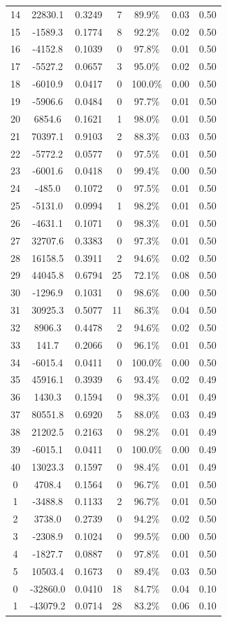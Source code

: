 \documentclass{article}
\begin{document}
\begin{longtable}{@{}cccrccc@{}}
14 & 22830.1 & 0.3249 & 7 & 89.9\% & 0.03 & 0.50 \\
15 & -1589.3 & 0.1774 & 8 & 92.2\% & 0.02 & 0.50 \\
16 & -4152.8 & 0.1039 & 0 & 97.8\% & 0.01 & 0.50 \\
17 & -5527.2 & 0.0657 & 3 & 95.0\% & 0.02 & 0.50 \\
18 & -6010.9 & 0.0417 & 0 & 100.0\% & 0.00 & 0.50 \\
19 & -5906.6 & 0.0484 & 0 & 97.7\% & 0.01 & 0.50 \\
20 & 6854.6 & 0.1621 & 1 & 98.0\% & 0.01 & 0.50 \\
21 & 70397.1 & 0.9103 & 2 & 88.3\% & 0.03 & 0.50 \\
22 & -5772.2 & 0.0577 & 0 & 97.5\% & 0.01 & 0.50 \\
23 & -6001.6 & 0.0418 & 0 & 99.4\% & 0.00 & 0.50 \\
24 & -485.0 & 0.1072 & 0 & 97.5\% & 0.01 & 0.50 \\
25 & -5131.0 & 0.0994 & 1 & 98.2\% & 0.01 & 0.50 \\
26 & -4631.1 & 0.1071 & 0 & 98.3\% & 0.01 & 0.50 \\
27 & 32707.6 & 0.3383 & 0 & 97.3\% & 0.01 & 0.50 \\
28 & 16158.5 & 0.3911 & 2 & 94.6\% & 0.02 & 0.50 \\
29 & 44045.8 & 0.6794 & 25 & 72.1\% & 0.08 & 0.50 \\
30 & -1296.9 & 0.1031 & 0 & 98.6\% & 0.00 & 0.50 \\
31 & 30925.3 & 0.5077 & 11 & 86.3\% & 0.04 & 0.50 \\
32 & 8906.3 & 0.4478 & 2 & 94.6\% & 0.02 & 0.50 \\
33 & 141.7 & 0.2066 & 0 & 96.1\% & 0.01 & 0.50 \\
34 & -6015.4 & 0.0411 & 0 & 100.0\% & 0.00 & 0.50 \\
35 & 45916.1 & 0.3939 & 6 & 93.4\% & 0.02 & 0.49 \\
36 & 1430.3 & 0.1594 & 0 & 98.3\% & 0.01 & 0.49 \\
37 & 80551.8 & 0.6920 & 5 & 88.0\% & 0.03 & 0.49 \\
38 & 21202.5 & 0.2163 & 0 & 98.2\% & 0.01 & 0.49 \\
39 & -6015.1 & 0.0411 & 0 & 100.0\% & 0.00 & 0.49 \\
40 & 13023.3 & 0.1597 & 0 & 98.4\% & 0.01 & 0.49 \\
0 & 4708.4 & 0.1564 & 0 & 96.7\% & 0.01 & 0.50 \\
1 & -3488.8 & 0.1133 & 2 & 96.7\% & 0.01 & 0.50 \\
2 & 3738.0 & 0.2739 & 0 & 94.2\% & 0.02 & 0.50 \\
3 & -2308.9 & 0.1024 & 0 & 99.5\% & 0.00 & 0.50 \\
4 & -1827.7 & 0.0887 & 0 & 97.8\% & 0.01 & 0.50 \\
5 & 10503.4 & 0.1673 & 0 & 89.4\% & 0.03 & 0.50 \\ \midrule
0 & -32860.0 & 0.0410 & 18 & 84.7\% & 0.04 & 0.10 \\
1 & -43079.2 & 0.0714 & 28 & 83.2\% & 0.06 & 0.10 \\
\end{longtable}
\end{document}
